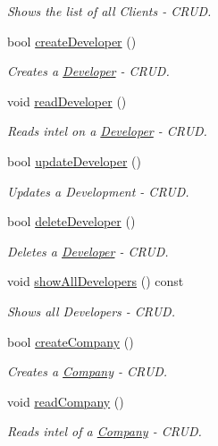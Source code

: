 \begin{DoxyCompactItemize}
\begin{DoxyCompactList}\small\item\em Shows the list of all Clients -\/ C\-R\-U\-D. \end{DoxyCompactList}\item 
bool \hyperlink{class_app_store_ab378b7986b83da52f332ac5a2799a6e5}{create\-Developer} ()
\begin{DoxyCompactList}\small\item\em Creates a \hyperlink{class_developer}{Developer} -\/ C\-R\-U\-D. \end{DoxyCompactList}\item 
void \hyperlink{class_app_store_a99fac835be3628e1731240269bc89210}{read\-Developer} ()
\begin{DoxyCompactList}\small\item\em Reads intel on a \hyperlink{class_developer}{Developer} -\/ C\-R\-U\-D. \end{DoxyCompactList}\item 
bool \hyperlink{class_app_store_aadd55aac42b87dc5ff85b8aec545e40d}{update\-Developer} ()
\begin{DoxyCompactList}\small\item\em Updates a Development -\/ C\-R\-U\-D. \end{DoxyCompactList}\item 
bool \hyperlink{class_app_store_ab23c0791d05005afb59b35aa2b0524ff}{delete\-Developer} ()
\begin{DoxyCompactList}\small\item\em Deletes a \hyperlink{class_developer}{Developer} -\/ C\-R\-U\-D. \end{DoxyCompactList}\item 
void \hyperlink{class_app_store_ad033cdc08a36cd98bfbfa2017990ef97}{show\-All\-Developers} () const 
\begin{DoxyCompactList}\small\item\em Shows all Developers -\/ C\-R\-U\-D. \end{DoxyCompactList}\item 
bool \hyperlink{class_app_store_aedcb4195dc5918718d628417e6b97b95}{create\-Company} ()
\begin{DoxyCompactList}\small\item\em Creates a \hyperlink{class_company}{Company} -\/ C\-R\-U\-D. \end{DoxyCompactList}\item 
void \hyperlink{class_app_store_a04f506638e8e949ce3a325cb5a6663ae}{read\-Company} ()
\begin{DoxyCompactList}\small\item\em Reads intel of a \hyperlink{class_company}{Company} -\/ C\-R\-U\-D. \end{DoxyCompactList}\item 

\end{DoxyCompactItemize}
